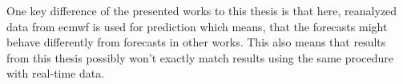 One key difference of the presented works to this thesis is that here, reanalyzed data from \gls{ecmwf} is used for prediction which means, that the forecasts might behave differently from forecasts in other works. This also means that results from this thesis possibly won't exactly match results using the same procedure with real-time data.\\

